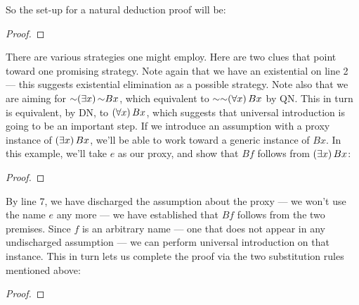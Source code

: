 So the set-up for a natural deduction proof will be:

\begin{proof}
	 \pr{}
	 
	\have{}{}{}
\end{proof}

There are various strategies one might employ. Here are two clues that point toward one promising strategy. Note again that we have an existential on line 2 --- this suggests existential elimination as a possible strategy. Note also that we are aiming for $\enot \qt{\exists}{x} \enot Bx$, which equivalent to $\enot \enot \qt{\forall}{x} Bx$ by QN. This in turn is equivalent, by DN, to $(\forall x) \, Bx$, which suggests that universal introduction is going to be an important step. If we introduce an assumption with a proxy instance of $(\exists x) \, Bx$, we'll be able to work toward a generic instance of $Bx$. In this example, we'll take $e$ as our proxy, and show that $Bf$ follows from $(\exists x) \, Bx$:

\begin{proof}
	 \pr{}
	 
	\open
	\close
\end{proof}

By line 7, we have discharged the assumption about the proxy --- we won't use the name $e$ any more --- we have established that $Bf$ follows from the two premises. Since $f$ is an arbitrary name --- one that does not appear in any undischarged assumption --- we can perform universal introduction on that instance. This in turn lets us complete the proof via the two substitution rules mentioned above:

\begin{proof}
	 \pr{}
	 
	\open
	\close
\end{proof}



